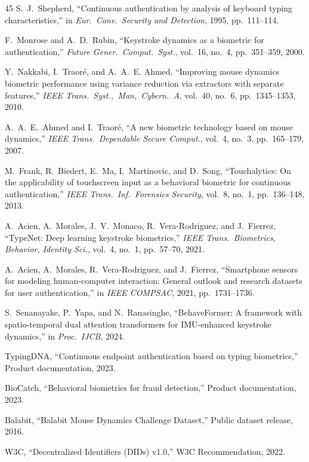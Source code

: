 \documentclass[journal,twoside,10pt]{IEEEtran}
\begin{document}
\begin{thebibliography}{45}
S.~J.~Shepherd, ``Continuous authentication by analysis of keyboard typing
characteristics,'' in \emph{Eur.\ Conv.\ Security and Detection}, 1995,
pp.~111--114.

F.~Monrose and A.~D.~Rubin, ``Keystroke dynamics as a biometric for
authentication,'' \emph{Future Gener.\ Comput.\ Syst.}, vol.~16, no.~4,
pp.~351--359, 2000.

Y.~Nakkabi, I.~Traor{\'e}, and A.~A.~E. Ahmed, ``Improving mouse dynamics
biometric performance using variance reduction via extractors with separate
features,'' \emph{IEEE Trans.\ Syst.,\ Man,\ Cybern.\ A}, vol.~40, no.~6,
pp.~1345--1353, 2010.

A.~A.~E.~Ahmed and I.~Traor{\'e}, ``A new biometric technology based on
mouse dynamics,'' \emph{IEEE Trans.\ Dependable Secure Comput.}, vol.~4,
no.~3, pp.~165--179, 2007.

M.~Frank, R.~Biedert, E.~Ma, I.~Martinovic, and D.~Song, ``Touchalytics:
On the applicability of touchscreen input as a behavioral biometric for
continuous authentication,'' \emph{IEEE Trans.\ Inf.\ Forensics Security},
vol.~8, no.~1, pp.~136--148, 2013.

A.~Acien, A.~Morales, J.~V.~Monaco, R.~Vera-Rodriguez, and J.~Fierrez,
``TypeNet: Deep learning keystroke biometrics,''
\emph{IEEE Trans.\ Biometrics, Behavior, Identity Sci.}, vol.~4, no.~1,
pp.~57--70, 2021.

A.~Acien, A.~Morales, R.~Vera-Rodriguez, and J.~Fierrez, ``Smartphone
sensors for modeling human-computer interaction: General outlook and
research datasets for user authentication,'' in \emph{IEEE COMPSAC}, 2021,
pp.~1731--1736.

S.~Senanayake, P.~Yapa, and N.~Ranasinghe, ``BehaveFormer: A framework with
spatio-temporal dual attention transformers for IMU-enhanced keystroke
dynamics,'' in \emph{Proc.\ IJCB}, 2024.

TypingDNA, ``Continuous endpoint authentication based on typing
biometrics,'' Product documentation, 2023.

BioCatch, ``Behavioral biometrics for fraud detection,'' Product
documentation, 2023.

Balabit, ``Balabit Mouse Dynamics Challenge Dataset,'' Public dataset
release, 2016.

W3C, ``Decentralized Identifiers (DIDs) v1.0,'' W3C Recommendation, 2022.


\end{thebibliography}
\end{document}
